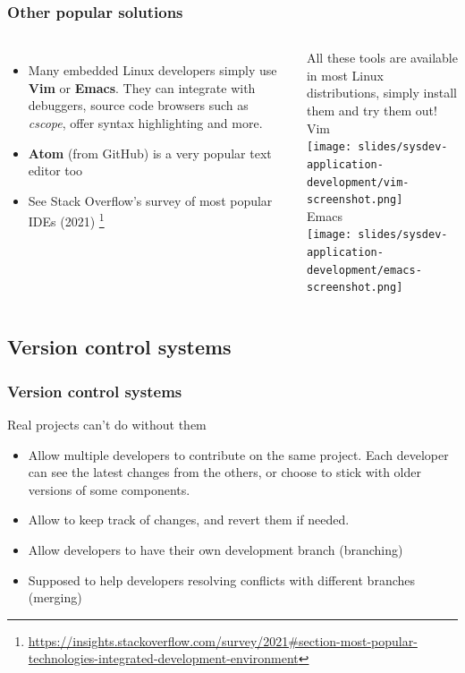 \begin{frame}
  \frametitle{Other popular solutions}
  \begin{columns}[T]
    \begin{itemize}
    \item Many embedded Linux developers simply use {\bf Vim} or {\bf
        Emacs}. They can integrate with debuggers, source code browsers
        such as {\em cscope}, offer syntax highlighting and more.
    \item {\bf Atom} (from GitHub) is a very popular text editor too
    \item See Stack Overflow's survey of most popular IDEs (2021)
          \footnote{\tiny \url{https://insights.stackoverflow.com/survey/2021\#section-most-popular-technologies-integrated-development-environment}}
    \end{itemize}
    All these tools are available in most Linux distributions, simply
    install them and try them out!
    {\small Vim \\
    \texttt{[image: slides/sysdev-application-development/vim-screenshot.png]}\\
    Emacs \\
    \texttt{[image: slides/sysdev-application-development/emacs-screenshot.png]}
    }
  \end{columns}
\end{frame}

\subsection{Version control systems}

\begin{frame}
  \frametitle{Version control systems}
  Real projects can't do without them
  \begin{itemize}
  \item Allow multiple developers to contribute on the same
    project. Each developer can see the latest changes from the
    others, or choose to stick with older versions of some components.
  \item Allow to keep track of changes, and revert them if needed.
  \item Allow developers to have their own development branch
    (branching)
  \item Supposed to help developers resolving conflicts with different
    branches (merging)
  \end{itemize}
\end{frame}

